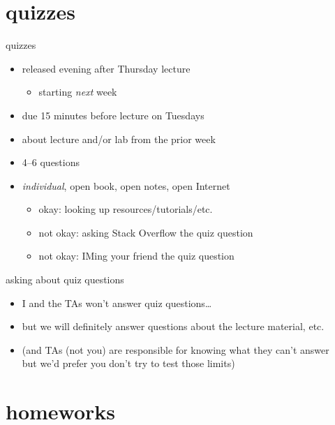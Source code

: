 \section{quizzes}


\begin{frame}{quizzes}
    \begin{itemize}
    \item released evening after Thursday lecture
        \begin{itemize}
        \item starting \textit{next} week
        \end{itemize}
    \item due 15 minutes before lecture on Tuesdays
    \vspace{.5cm}
    \item about lecture and/or lab from the prior week
    \item 4--6 questions
    \item \textit{individual}, open book, open notes, open Internet
        \begin{itemize}
        \item okay: looking up resources/tutorials/etc.
        \item not okay: asking Stack Overflow the quiz question
        \item not okay: IMing your friend the quiz question
        \end{itemize}
    \end{itemize}
\end{frame}

\begin{frame}{asking about quiz questions}
    \begin{itemize}
    \item I and the TAs won't answer quiz questions\ldots
    \item but we will definitely answer questions about the lecture material, etc.
    \vspace{.5cm}
    \item (and TAs (not you) are responsible for knowing what they can't answer \\
        but we'd prefer you don't try to test those limits)
    \end{itemize}
\end{frame}


\section{homeworks}

